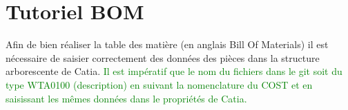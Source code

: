 \section{Tutoriel BOM}

\par Afin de bien réaliser la table des matière (en anglais Bill Of Materials) il est nécessaire de saisier correctement des données des pièces dans la structure arborescente de Catia. \textcolor{green}{Il est impératif que le nom du fichiers dans le git soit du type WT\textunderscore A0100 (description) en suivant la nomenclature du COST et en saisissant les mêmes données dans le propriétés de Catia.}

\\

